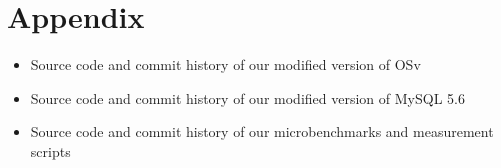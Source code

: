 \documentclass[12pt,a4paper]{article}
\begin{document}
\section{Appendix}

\begin{itemize}
    \item Source code and commit history of our modified version of OSv
    \item Source code and commit history of our modified version of MySQL 5.6
    \item Source code and commit history of our microbenchmarks and measurement scripts
\end{itemize}

\clearpage

\printbibliography
\end{document}
